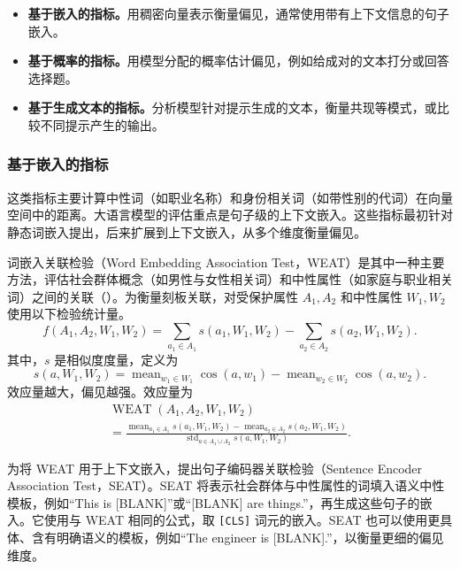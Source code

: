 \begin{itemize}
\item \textbf{基于嵌入的指标。}用稠密向量表示衡量偏见，通常使用带有上下文信息的句子嵌入。
\item \textbf{基于概率的指标。}用模型分配的概率估计偏见，例如给成对的文本打分或回答选择题。
\item \textbf{基于生成文本的指标。}分析模型针对提示生成的文本，衡量共现等模式，或比较不同提示产生的输出。
\end{itemize}

\subsubsection{基于嵌入的指标}
这类指标主要计算中性词（如职业名称）和身份相关词（如带性别的代词）在向量空间中的距离。大语言模型的评估重点是句子级的上下文嵌入。这些指标最初针对静态词嵌入提出，后来扩展到上下文嵌入，从多个维度衡量偏见。

词嵌入关联检验（Word Embedding Association Test，WEAT）是其中一种主要方法，评估社会群体概念（如男性与女性相关词）和中性属性（如家庭与职业相关词）之间的关联（）。为衡量刻板关联，对受保护属性 $A_1,A_2$ 和中性属性 $W_1,W_2$ 使用以下检验统计量。
\begin{equation}
f(A_1,A_2,W_1,W_2)
=\sum_{a_1\in A_1}s(a_1,W_1,W_2)-\sum_{a_2\in A_2}s(a_2,W_1,W_2).
\label{eq:ch06-weat-statistic}
\end{equation}
其中，$s$ 是相似度度量，定义为
\begin{equation}
s(a,W_1,W_2)=
\operatorname{mean}_{w_1\in W_1}\cos(a,w_1)
-\operatorname{mean}_{w_2\in W_2}\cos(a,w_2).
\label{eq:ch06-weat-similarity}
\end{equation}
效应量越大，偏见越强。效应量为
\begin{multline}
\operatorname{WEAT}(A_1,A_2,W_1,W_2)\\
=
\frac{\operatorname{mean}_{a_1\in A_1}s(a_1,W_1,W_2)
      -\operatorname{mean}_{a_2\in A_2}s(a_2,W_1,W_2)}
     {\operatorname{std}_{a\in A_1\cup A_2}s(a,W_1,W_2)}.
\label{eq:ch06-weat-effect}
\end{multline}

为将 WEAT 用于上下文嵌入，提出句子编码器关联检验（Sentence Encoder Association Test，SEAT）。SEAT 将表示社会群体与中性属性的词填入语义中性模板，例如“This is [BLANK]”或“[BLANK] are things.”，再生成这些句子的嵌入。它使用与 WEAT 相同的公式，取 \texttt{[CLS]} 词元的嵌入。SEAT 也可以使用更具体、含有明确语义的模板，例如“The engineer is [BLANK].”，以衡量更细的偏见维度。

